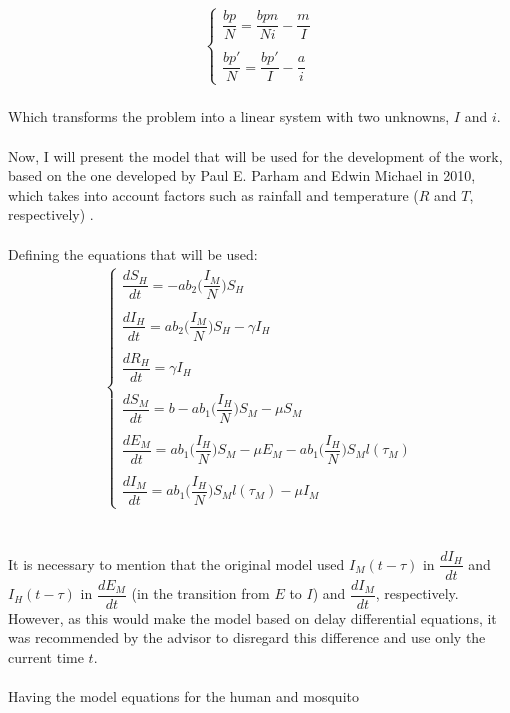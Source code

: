 \begin{gather*}
\begin{cases}
\dfrac{bp}{N} = \dfrac{bpn}{Ni} -\dfrac{m}{I} \\
\\
\dfrac{bp'}{N} = \dfrac{bp'}{I} -\dfrac{a}{i} 
\end{cases}
\end{gather*}
\\
Which transforms the problem into a linear 
system with two unknowns, $I$ and $i$.
\\\\
Now, I will present the model that will be used 
for the development of the work, based on the one 
developed by Paul E. Parham and Edwin Michael in 
2010, which takes into account factors such as 
rainfall and temperature ($R$ and $T$, respectively) \cite{Parham2010}.
\\\\
Defining the equations that will be used:
\begin{gather*}
\begin{cases}
\dfrac{dS_H}{dt} = -ab_2\bigg(\dfrac{I_M}{N}\bigg)S_H\\
\\
\dfrac{dI_H}{dt} = ab_2\bigg(\dfrac{I_M}{N}\bigg)S_H-\gamma I_H\\
\\
\dfrac{dR_H}{dt} = \gamma I_H\\
\\
\dfrac{dS_M}{dt} = b - ab_1\bigg(\dfrac{I_H}{N}\bigg)S_M - \mu S_M\\
\\
\dfrac{dE_M}{dt} = ab_1\bigg(\dfrac{I_H}{N}\bigg)S_M - \mu E_M - ab_1\bigg(\dfrac{I_H}{N}\bigg)S_Ml(\tau_M)\\
\\
\dfrac{dI_M}{dt} = ab_1\bigg(\dfrac{I_H}{N}\bigg)S_Ml(\tau_M) -\mu I_M
\end{cases}
\end{gather*}
\\\\
It is necessary to mention that the original model 
used $I_M(t-\tau)$ in $\dfrac{dI_H}{dt}$ and $I_H(t-\tau)$ in 
$\dfrac{dE_M}{dt}$ (in the transition from $E$ to $I$) and 
$\dfrac{dI_M}{dt}$, respectively. However, as this would 
make the model based on delay differential equations, it was 
recommended by the advisor to disregard this difference and use 
only the current time $t$.
\\\\
Having the model equations for the human and mosquito 

